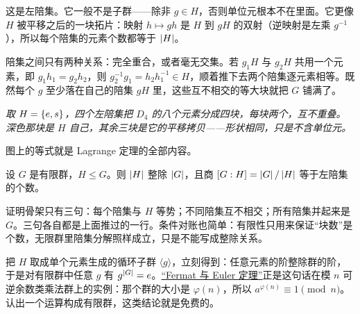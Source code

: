 这是左陪集。它一般不是子群——除非 \(g\in H\)，否则单位元根本不在里面。它更像 \(H\) 被平移之后的一块拓片：映射 \(h\mapsto gh\) 是 \(H\) 到 \(gH\) 的双射（逆映射是左乘 \(g^{-1}\)），所以每个陪集的元素个数都等于 \(\left|H\right|\)。

陪集之间只有两种关系：完全重合，或者毫无交集。若 \(g_1H\) 与 \(g_2H\) 共用一个元素，即 \(g_1h_1=g_2h_2\)，则 \(g_2^{-1}g_1=h_2h_1^{-1}\in H\)，顺着推下去两个陪集逐元素相等。既然每个 \(g\) 至少落在自己的陪集 \(gH\) 里，这些互不相交的等大块就把 \(G\) 铺满了。

\begin{center}

\emph{取 \(H=\left\{e,s\right\}\)，四个左陪集把 \(D_4\) 的八个元素分成四块，每块两个，互不重叠。深色那块是 \(H\) 自己，其余三块是它的平移拷贝——形状相同，只是不含单位元。}
\end{center}

图上的等式就是 Lagrange 定理的全部内容。

\begin{theorem}[Lagrange]
设 \(G\) 是有限群，\(H\le G\)。则 \(\left|H\right|\) 整除 \(\left|G\right|\)，且商 \([G:H]=\left|G\right|/\left|H\right|\) 等于左陪集的个数。
\end{theorem}

证明骨架只有三句：每个陪集与 \(H\) 等势；不同陪集互不相交；所有陪集并起来是 \(G\)。三句各自都是上面推过的一行。条件对账也简单：有限性只用来保证``块数''是个数，无限群里陪集分解照样成立，只是不能写成整除关系。

把 \(H\) 取成单个元素生成的循环子群 \(\langle g\rangle\)，立刻得到：任意元素的阶整除群的阶，于是对有限群中任意 \(g\) 有 \(g^{\left|G\right|}=e\)。\hyperref[sec:04-Discrete-Mathematics/04-Number-Theory/03]{``Fermat 与 Euler 定理''}正是这句话在模 \(n\) 可逆余数类乘法群上的实例：那个群的大小是 \(\varphi(n)\)，所以 \(a^{\varphi(n)}\equiv1\pmod n\)。认出一个运算构成有限群，这类结论就是免费的。

